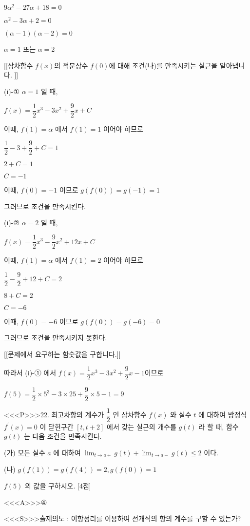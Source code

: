 \documentclass{oblivoir}
\begin{document}
$9 \alpha^{2}-27 \alpha+18=0$

$\alpha^{2}-3 \alpha+2=0$

$(\alpha-1)(\alpha-2)=0$

$\alpha=1$ 또는 $\alpha=2$

[[삼차함수 $f(x)$의 적분상수 $f(0)$에 대해 조건(나)를 만족시키는 실근을 알아냅니다.  ]]

(i)-① $\alpha=1$ 일 때,

$f(x)=\dfrac{1}{2} x^{3}-3 x^{2}+\dfrac{9}{2} x+C$

이때, $f(1)=\alpha$ 에서 $f(1)=1$ 이어야 하므로

$\dfrac{1}{2}-3+\dfrac{9}{2}+C=1$

$2+C=1$

$C=-1$

이때, $f(0)=-1$ 이므로 $g(f(0))=g(-1)=1$

그러므로 조건을 만족시킨다.

(i)-② $\alpha=2$ 일 때,

$f(x)=\dfrac{1}{2} x^{3}-\dfrac{9}{2} x^{2}+12 x+C$

이때, $f(1)=\alpha$ 에서 $f(1)=2$ 이어야 하므로

$\dfrac{1}{2}-\dfrac{9}{2}+12+C=2$

$8+C=2$

$C=-6$

이때, $f(0)=-6$ 이므로 $g(f(0))=g(-6)=0$

그러므로 조건을 만족시키지 못한다.

[[문제에서 요구하는 함숫값을 구합니다.]]

따라서 (i)-① 에서 $f(x) =\dfrac{1}{2} x^{3}-3 x^{2}+\dfrac{9}{2} x-1$이므로

$f(5) =\dfrac{1}{2} \times 5^{3}-3 \times 25+\dfrac{9}{2} \times 5-1 =9$


<<<P>>>22. 최고차항의 계수가 $\dfrac{1}{2}$ 인 삼차함수 $f(x)$ 와 실수 $t$ 에 대하여 방정식 $f^{\prime}(x)=0$ 이 닫힌구간 $[t, t+2]$ 에서 갖는 실근의 개수를 $g(t)$ 라 할 때, 함수 $g(t)$ 는 다음 조건을 만족시킨다.

(가) 모든 실수 $a$ 에 대하여 $\displaystyle\lim _{t \rightarrow a+} g(t)+\displaystyle\lim _{t \rightarrow a-} g(t) \leq 2$ 이다.

(나) $g(f(1))=g(f(4))=2, g(f(0))=1$

$f(5)$ 의 값을 구하시오. [4점]


<<<A>>>④

<<<S>>>출제의도 : 이항정리를 이용하여 전개식의 항의 계수를 구할 수 있는가?
\end{document}
